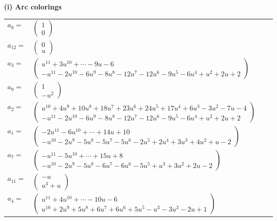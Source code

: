 \documentclass[1p]{elsarticle_modified}
\theoremstyle{definition}
\begin{document}
\flushleft \textbf{(i) Arc colorings}\\
\begin{tabular}{m{7pt} m{180pt} m{7pt} m{180pt} }
\flushright $a_{8}=$&$\begin{pmatrix}1\\0\end{pmatrix}$ \\
\flushright $a_{12}=$&$\begin{pmatrix}0\\u\end{pmatrix}$ \\
\flushright $a_{3}=$&$\begin{pmatrix}u^{11}+3 u^{10}+\cdots-9 u-6\\- u^{11}-2 u^{10}-6 u^9-8 u^8-12 u^7-12 u^6-9 u^5-6 u^4+u^2+2 u+2\end{pmatrix}$ \\
\flushright $a_{9}=$&$\begin{pmatrix}1\\- u^2\end{pmatrix}$ \\
\flushright $a_{2}=$&$\begin{pmatrix}u^{10}+4 u^9+10 u^8+18 u^7+23 u^6+24 u^5+17 u^4+6 u^3-3 u^2-7 u-4\\- u^{11}-2 u^{10}-6 u^9-8 u^8-12 u^7-12 u^6-9 u^5-6 u^4+u^2+2 u+2\end{pmatrix}$ \\
\flushright $a_{1}=$&$\begin{pmatrix}-2 u^{11}-6 u^{10}+\cdots+14 u+10\\- u^{10}-2 u^9-5 u^8-5 u^7-5 u^6-2 u^5+2 u^4+3 u^3+4 u^2+u-2\end{pmatrix}$ \\
\flushright $a_{7}=$&$\begin{pmatrix}- u^{11}-5 u^{10}+\cdots+15 u+8\\- u^{10}-2 u^9-5 u^8-6 u^7-6 u^6-5 u^5+u^3+3 u^2+2 u-2\end{pmatrix}$ \\
\flushright $a_{11}=$&$\begin{pmatrix}- u\\u^3+u\end{pmatrix}$ \\
\flushright $a_{4}=$&$\begin{pmatrix}u^{11}+4 u^{10}+\cdots-10 u-6\\u^{10}+2 u^9+5 u^8+6 u^7+6 u^6+5 u^5- u^3-3 u^2-2 u+1\end{pmatrix}$ \\

\end{tabular}
\end{document}

